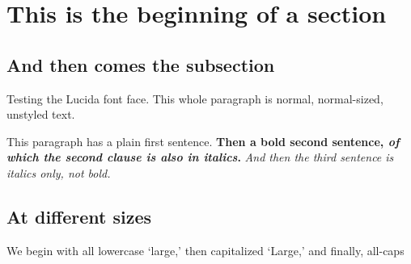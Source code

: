 \documentclass[lucida]{sp}
\begin{document}
\section{This is the beginning of a section}

\subsection{And then comes the subsection}

Testing the Lucida font face. This whole paragraph is normal, normal-sized, unstyled text.

This paragraph has a plain first sentence.
\textbf{Then a bold second sentence, \emph{of which the second clause is also in italics}.}
\emph{And then the third sentence is italics only, not bold.}

\subsection{At different sizes}

{\large We begin with all lowercase `large,' {\Large then capitalized `Large,' {\LARGE and finally, all-caps}}}
\end{document}
